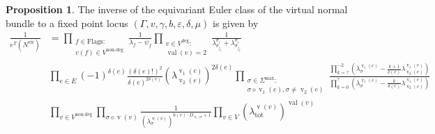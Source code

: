 \documentclass[11pt]{amsart}
\newcommand{\val}{\operatorname{val}}
\newcommand{\vv}{\operatorname{v}}
\theoremstyle{definition}
\newtheorem{prop}[thm]{Proposition}
\theoremstyle{definition}
\begin{document}
\begin{prop}
 The inverse of the equivariant Euler class of the virtual normal bundle to a fixed point locus $\left(\Gamma, v, \gamma, b,\varepsilon,\delta,\mu\right)$ is given by
\begin{equation}
 \begin{aligned}
  \frac{1}{e^T(N^{\text{vir}})}&=\prod_{\substack{f\in\text{Flags}\colon \\v(f)\in V^{\text{non-deg}}}}\frac{1}{\lambda_f-\psi_f}\prod_{\substack{v\in V^\text{deg}\colon \\ \val(v)=2}}\frac{1}{\lambda^{\sigma_i}_{\sigma_{j_1}}+\lambda^{\sigma_i}_{\sigma_{j_2}}} \\
  &\prod_{e\in E}(-1)^{\delta(e)}\frac{(\delta(e)!)^2}{\delta(e)^{2\delta(e)}}(\lambda^{\vv_1(e)}_{\vv_2(e)})^{2\delta(e)}\prod_{\substack{\sigma\in\Sigma^{\text{max}}: \\ \sigma\diamond\vv_1(e),\sigma\neq\vv_2(e)}}\frac{\prod_{k=?}^{-2}(\lambda^{\vv_1(e)}_{\sigma}-\frac{k+1}{\delta(e)}\lambda^{\vv_1(e)}_{\vv_2(e)})}{\prod_{k=0}^{?}(\lambda^{\vv_1(e)}_{\sigma}-\frac{k}{\delta(e)}\lambda^{\vv_1(e)}_{\vv_2(e)})} \\
  & \prod_{v\in V^{\text{non-deg}}}\prod_{\sigma\diamond \vv(v)}\frac{1}{(\lambda^{\vv(v)}_{\sigma})^{b(v)\cdot D_{\vv_v\setminus\sigma}+1}}\prod_{v\in V}(\lambda^{\vv(v)}_{\text{tot}})^{\val(v)}
 \end{aligned}
\end{equation}
\end{prop}


\appendix




\bigskip\bigskip


\end{document}
